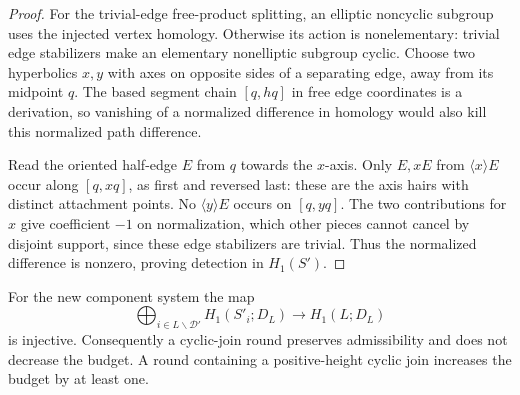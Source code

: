 \begin{proof}
For the trivial-edge free-product splitting, an elliptic noncyclic subgroup uses the injected vertex homology. Otherwise its action is nonelementary: trivial edge stabilizers make an elementary nonelliptic subgroup cyclic. Choose two hyperbolics \(x,y\) with axes on opposite sides of a separating edge, away from its midpoint \(q\). The based segment chain \([q,hq]\) in free edge coordinates is a derivation, so vanishing of a normalized difference in homology would also kill this normalized path difference.

Read the oriented half-edge \(E\) from \(q\) towards the \(x\)-axis. Only \(E,xE\) from \(\langle x\rangle E\) occur along \([q,xq]\), as first and reversed last: these are the axis hairs with distinct attachment points. No \(\langle y\rangle E\) occurs on \([q,yq]\). The two contributions for \(x\) give coefficient \(-1\) on normalization, which other pieces cannot cancel by disjoint support, since these edge stabilizers are trivial. Thus the normalized difference is nonzero, proving detection in \(H_1(S')\).
\end{proof}

\begin{proposition}\label{close:join-injection}
For the new component system the map
\[
 \bigoplus_{i\in L\backslash\mathcal D'}H_1(S'_i;D_L)
       \longrightarrow H_1(L;D_L)
\]
is injective. Consequently a cyclic-join round preserves
admissibility and does not decrease the budget. A round containing a
positive-height cyclic join increases the budget by at least one.
\end{proposition}

